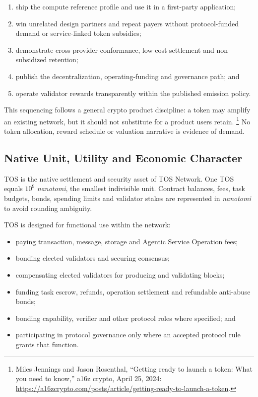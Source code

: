 \documentclass[11pt,oneside]{article}
\newcommand{\nanotos}{\textit{nanotomi}}
\begin{document}
\begin{enumerate}
  \item ship the compute reference profile and use it in a first-party application;
  \item win unrelated design partners and repeat payers without protocol-funded demand or
        service-linked token subsidies;
  \item demonstrate cross-provider conformance, low-cost settlement and non-subsidized
        retention;
  \item publish the decentralization, operating-funding and governance path; and
  \item operate validator rewards transparently within the published emission policy.
\end{enumerate}

This sequencing follows a general crypto product discipline: a token may amplify an existing
network, but it should not substitute for a product users retain.
\footnote{Miles Jennings and Jason Rosenthal, ``Getting ready to launch a token: What you need
to know,'' a16z crypto, April 25, 2024:
\url{https://a16zcrypto.com/posts/article/getting-ready-to-launch-a-token}.}
No token allocation, reward schedule or valuation narrative is evidence of demand.

\subsection{Native Unit, Utility and Economic Character}

TOS is the native settlement and security asset of TOS Network. One TOS equals $10^9$
\nanotos, the smallest indivisible unit. Contract balances, fees, task budgets, bonds,
spending limits and validator stakes are represented in \nanotos{} to avoid rounding
ambiguity.

TOS is designed for functional use within the network:

\begin{itemize}
  \item paying transaction, message, storage and Agentic Service Operation fees;
  \item bonding elected validators and securing consensus;
  \item compensating elected validators for producing and validating blocks;
  \item funding task escrow, refunds, operation settlement and refundable anti-abuse bonds;
  \item bonding capability, verifier and other protocol roles where specified; and
  \item participating in protocol governance only where an accepted protocol rule grants
        that function.
\end{itemize}
\end{document}
